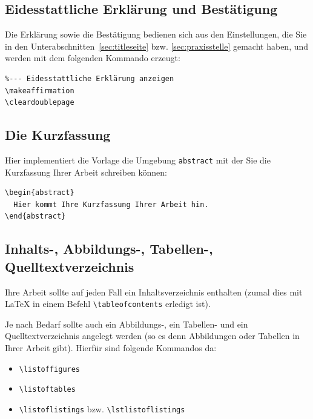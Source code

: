 \documentclass[pdftex,abstracton,a4paper]{scrartcl}
\begin{document}

\subsection{Eidesstattliche Erklärung und Bestätigung}

Die Erklärung sowie die Bestätigung bedienen sich aus den Einstellungen, die Sie in den Unterabschnitten~\ref{sec:titleseite} bzw. \ref{sec:praxisstelle} gemacht haben, und werden mit dem folgenden Kommando erzeugt:

\begin{verbatim}
%--- Eidesstattliche Erklärung anzeigen
\makeaffirmation
\cleardoublepage
\end{verbatim}

\subsection{Die Kurzfassung}

Hier implementiert die Vorlage die Umgebung \verb+abstract+ mit der Sie die Kurzfassung Ihrer Arbeit schreiben können:

\begin{verbatim}
\begin{abstract}
  Hier kommt Ihre Kurzfassung Ihrer Arbeit hin.
\end{abstract}
\end{verbatim}


\subsection{Inhalts-, Abbildungs-, Tabellen-, Quelltextverzeichnis}

Ihre Arbeit sollte auf jeden Fall ein Inhaltsverzeichnis enthalten (zumal dies mit 
\LaTeX{} in einem Befehl \verb+\tableofcontents+ erledigt ist).

Je nach Bedarf sollte auch ein Abbildungs-, ein Tabellen- und ein Quelltextverzeichnis angelegt werden (so es denn Abbildungen oder Tabellen in Ihrer Arbeit gibt). Hierfür sind folgende Kommandos da:
\begin{itemize}
  \item \verb+\listoffigures+
  \item \verb+\listoftables+
  \item \verb+\listoflistings+ bzw. \verb+\lstlistoflistings+
\end{itemize}
\end{document}
